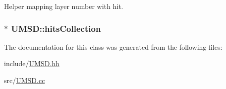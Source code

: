 Helper mapping layer number with hit. 

\hypertarget{classUMSD_a6b2f2c42a6be884619371760d8b8752d}{}
\subsubsection[{hits\+Collection}]{$\ast$ U\+M\+S\+D\+::hits\+Collection\hspace{0.3cm}{\ttfamily [private]}}\label{classUMSD_a6b2f2c42a6be884619371760d8b8752d}


The documentation for this class was generated from the following files\+:\begin{DoxyCompactItemize}
\item 
include/\hyperlink{UMSD_8hh}{U\+M\+S\+D.\+hh}\item 
src/\hyperlink{UMSD_8cc}{U\+M\+S\+D.\+cc}\end{DoxyCompactItemize}
